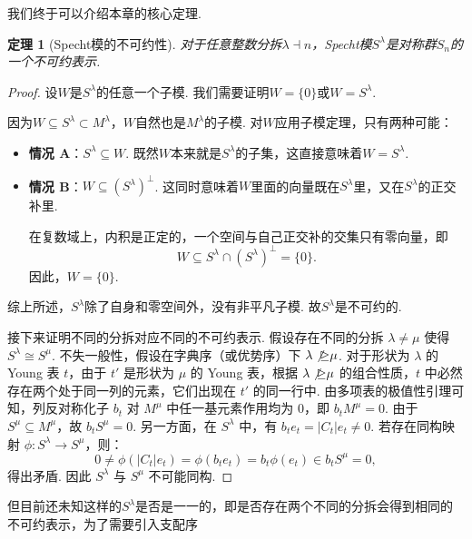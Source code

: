 \documentclass{sjtureport}
\newtheorem{theorem}{定理}[chapter]
\begin{document}
我们终于可以介绍本章的核心定理.
\begin{theorem}[Specht模的不可约性]
    对于任意整数分拆$\lambda \dashv n$，Specht模$S^\lambda$是对称群$S_n$的一个不可约表示.
\end{theorem}
\begin{proof}
    设$W$是$S^\lambda$的任意一个子模. 我们需要证明$W=\{0\}$或$W=S^\lambda$.
    
    因为$W \subseteq S^\lambda \subset M^\lambda$，$W$自然也是$M^\lambda$的子模. 
    对$W$应用子模定理，只有两种可能：
    \begin{itemize}
        \item \textbf{情况 A}：$S^\lambda \subseteq W$. 既然$W$本来就是$S^\lambda$的子集，这直接意味着$W = S^\lambda$.
        \item \textbf{情况 B}：$W \subseteq (S^\lambda)^\perp$. 这同时意味着$W$里面的向量既在$S^\lambda$里，又在$S^\lambda$的正交补里.\par
        在复数域上，内积是正定的，一个空间与自己正交补的交集只有零向量，即
    \begin{equation*}
        W \subseteq S^\lambda \cap (S^\lambda)^\perp = \{0\}.
    \end{equation*}
    因此，$W = \{0\}$.
    \end{itemize}
    
    
    
    综上所述，$S^\lambda$除了自身和零空间外，没有非平凡子模. 故$S^\lambda$是不可约的.
    
    接下来证明不同的分拆对应不同的不可约表示. 假设存在不同的分拆 $\lambda \neq \mu$ 使得 $S^\lambda \cong S^\mu$. 不失一般性，假设在字典序（或优势序）下 $\lambda \not\unrhd \mu$. 
    对于形状为 $\lambda$ 的 Young 表 $t$，由于 $t'$ 是形状为 $\mu$ 的 Young 表，根据 $\lambda \not\unrhd \mu$ 的组合性质，$t$ 中必然存在两个处于同一列的元素，它们出现在 $t'$ 的同一行中. 
    由多项表的极值性引理可知，列反对称化子 $b_t$ 对 $M^\mu$ 中任一基元素作用均为 $0$，即 $b_t M^\mu = 0$. 由于 $S^\mu \subseteq M^\mu$，故 $b_t S^\mu = 0$.
    另一方面，在 $S^\lambda$ 中，有 $b_t e_t = |C_t| e_t \neq 0$. 
    若存在同构映射 $\phi: S^\lambda \to S^\mu$，则：
    \begin{equation*}
        0 \neq \phi(|C_t| e_t) = \phi(b_t e_t) = b_t \phi(e_t) \in b_t S^\mu = 0,
    \end{equation*}
    得出矛盾. 因此 $S^\lambda$ 与 $S^\mu$ 不可能同构.
\end{proof}

但目前还未知这样的$S^\lambda$是否是一一的，即是否存在两个不同的分拆会得到相同的不可约表示，为了需要引入支配序
\end{document}
